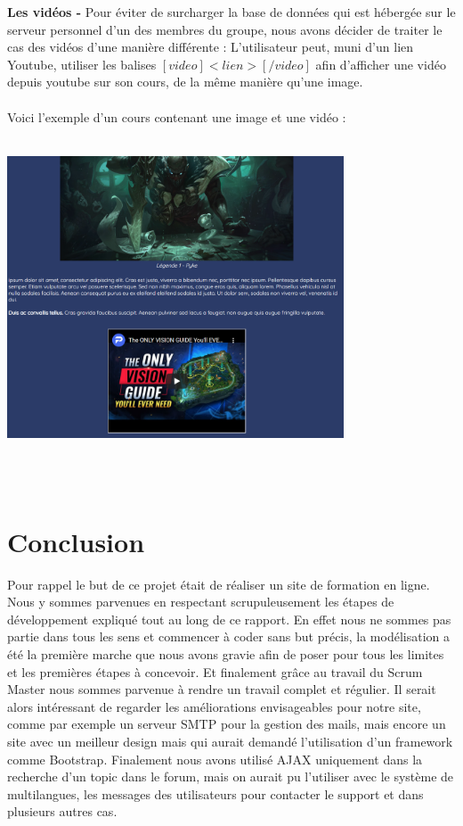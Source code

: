\documentclass[a4paper,11pt]{article}
\begin{document}
\textbf{Les vidéos - }Pour éviter de surcharger la base de données qui est hébergée sur le serveur personnel d'un des membres du groupe, nous avons décider de traiter le cas des vidéos d'une manière différente : L'utilisateur peut, muni d'un lien Youtube, utiliser les balises $[video]<lien>[/video]$ afin d'afficher une vidéo depuis youtube sur son cours, de la même manière qu'une image.\\\\
Voici l'exemple d'un cours contenant une image et une vidéo :\\\\
\centerline{
    \includegraphics[width=10cm]{images/imageVideo.png}
}\\\\

\section{Conclusion}
Pour rappel le but de ce projet était de réaliser un site de formation en ligne. Nous y sommes parvenues en respectant scrupuleusement les étapes de développement expliqué tout au long de ce rapport. En effet nous ne sommes pas partie dans tous les sens et commencer à coder sans but précis, la modélisation a été la première marche que nous avons gravie afin de poser pour tous les limites et les premières étapes à concevoir. Et finalement grâce au travail du Scrum Master nous sommes parvenue à rendre un travail complet et régulier. Il serait alors intéressant de regarder les améliorations envisageables pour notre site, comme par exemple un serveur SMTP pour la gestion des mails, mais encore un site avec un meilleur design mais qui aurait demandé l'utilisation d'un framework comme Bootstrap. Finalement nous avons utilisé AJAX uniquement dans la recherche d'un topic dans le forum, mais on aurait pu l'utiliser avec le système de multilangues, les messages des utilisateurs pour contacter le support et dans plusieurs autres cas.
\end{document}
